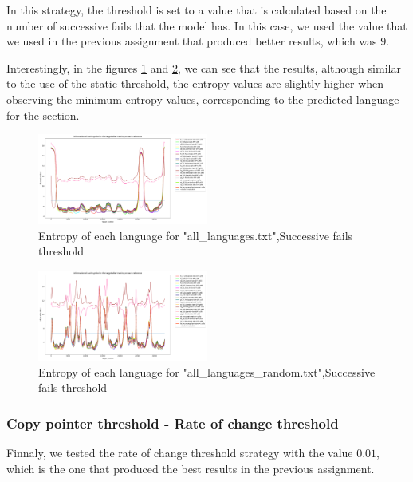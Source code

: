 \documentclass{article}
\begin{document}
In this strategy, the threshold is set to a value that is calculated based on the number of successive fails that the model has.
In this case, we used the value that we used in the previous assignment that produced better results, which was $9$.

Interestingly, in the figures \ref{fig:all_languages_t_f} and \ref{fig:all_languages_random_t_f}, we can see that the results, although similar to the use of the static threshold,
the entropy values are slightly higher when observing the minimum entropy values, corresponding to the predicted language for the section.

\begin{figure}
    \centering
    \includegraphics[width=0.5\textwidth]{../results/all_languages/-t_f:9.png}
    \caption{Entropy of each language for "all_languages.txt",Successive fails threshold}
    \label{fig:all_languages_t_f}
\end{figure}

\begin{figure}
    \centering
    \includegraphics[width=0.5\textwidth]{../results/all_languages_random/-t_f:9.png}
    \caption{Entropy of each language for "all_languages_random.txt",Successive fails threshold}
    \label{fig:all_languages_random_t_f}
\end{figure}

\subsubsection{Copy pointer threshold - Rate of change threshold}
\label{subsubsec:results_locate_lang_rate_of_change_threshold}

Finnaly, we tested the rate of change threshold strategy with the value $0.01$, which is the one that produced the best results in the previous assignment.
\end{document}
